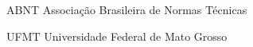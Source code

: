 \begin{siglas}
  \item[ABNT] Associação Brasileira de Normas Técnicas
  \item[UFMT] Universidade Federal de Mato Grosso
\end{siglas}